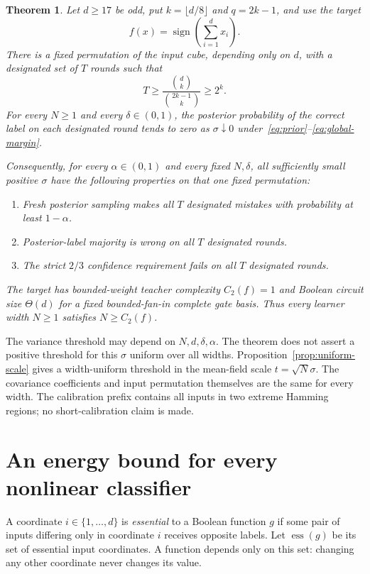 \documentclass[11pt]{article}
\newtheorem{theorem}{Theorem}
\newcommand{\sgn}{\operatorname{sign}}
\newcommand{\ess}{\operatorname{ess}}
\begin{document}
\begin{theorem}\label{thm:main}
Let $d\ge17$ be odd, put $k=\lfloor d/8\rfloor$ and $q=2k-1$, and use
the target
\[
 f(x)=\sgn\!\left(\sum_{i=1}^d x_i\right).
\]
There is a fixed permutation of the input cube, depending only on $d$,
with a designated set of $T$ rounds such that
\begin{equation}\label{eq:mistake-count}
 T\ge\frac{\binom d k}{\binom{2k-1}k}\ge2^k.
\end{equation}
For every $N\ge1$ and every $\delta\in(0,1)$, the posterior probability
of the correct label on each designated round tends to zero as
$\sigma\downarrow0$ under~\eqref{eq:prior}--\eqref{eq:global-margin}.

Consequently, for every $\alpha\in(0,1)$ and every fixed $N,\delta$,
all sufficiently small positive $\sigma$ have the following properties
on that one fixed permutation:
\begin{enumerate}
\item Fresh posterior sampling makes all $T$ designated mistakes with
probability at least $1-\alpha$.
\item Posterior-label majority is wrong on all $T$ designated rounds.
\item The strict $2/3$ confidence requirement fails on all $T$
designated rounds.
\end{enumerate}
The target has bounded-weight teacher complexity $C_2(f)=1$ and Boolean
circuit size $\Theta(d)$ for a fixed bounded-fan-in complete gate basis.
Thus every learner width $N\ge1$ satisfies $N\ge C_2(f)$.
\end{theorem}

The variance threshold may depend on $N,d,\delta,\alpha$.
The theorem does not assert a positive threshold for this $\sigma$
uniform over all widths. Proposition~\ref{prop:uniform-scale} gives
a width-uniform threshold in the mean-field scale $t=\sqrt N\sigma$.
The covariance coefficients and input permutation themselves are the
same for every width. The calibration prefix contains all inputs in two
extreme Hamming regions; no short-calibration claim is made.

\section{An energy bound for every nonlinear classifier}

A coordinate $i\in\{1,\ldots,d\}$ is \emph{essential} to a Boolean
function $g$ if some pair of inputs differing only in coordinate $i$
receives opposite labels. Let $\ess(g)$ be its set of essential input
coordinates. A function depends only on this set: changing any other
coordinate never changes its value.
\end{document}
